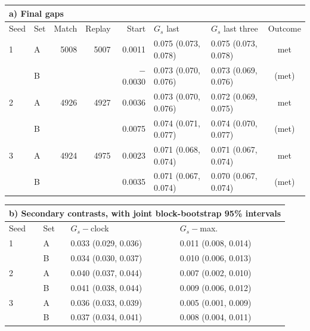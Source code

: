 \begin{tabular}{llrrrllc}
\multicolumn{8}{l}{a) Final gaps}\\
\toprule
Seed & Set & Match & Replay & Start & $G_s$ last & $G_s$ last three & Outcome\\
\midrule
1 & A & 5008 & 5007 & 0.0011 & 0.075 (0.073, 0.078) & 0.075 (0.073, 0.078) & met\\
 & B &  &  & $-$0.0030 & 0.073 (0.070, 0.076) & 0.073 (0.069, 0.076) & (met)\\
2 & A & 4926 & 4927 & 0.0036 & 0.073 (0.070, 0.076) & 0.072 (0.069, 0.075) & met\\
 & B &  &  & 0.0075 & 0.074 (0.071, 0.077) & 0.074 (0.070, 0.077) & (met)\\
3 & A & 4924 & 4975 & 0.0023 & 0.071 (0.068, 0.074) & 0.071 (0.067, 0.074) & met\\
 & B &  &  & 0.0035 & 0.071 (0.067, 0.074) & 0.070 (0.067, 0.074) & (met)\\
\bottomrule
\end{tabular}

\vspace{8pt}

\begin{tabular}{llll}
\multicolumn{4}{l}{b) Secondary contrasts, with joint block-bootstrap 95\% intervals}\\
\toprule
Seed & Set & $G_s-$clock & $G_s-$max.\\
\midrule
1 & A & 0.033 (0.029, 0.036) & 0.011 (0.008, 0.014)\\
 & B & 0.034 (0.030, 0.037) & 0.010 (0.006, 0.013)\\
2 & A & 0.040 (0.037, 0.044) & 0.007 (0.002, 0.010)\\
 & B & 0.041 (0.038, 0.044) & 0.009 (0.006, 0.012)\\
3 & A & 0.036 (0.033, 0.039) & 0.005 (0.001, 0.009)\\
 & B & 0.037 (0.034, 0.041) & 0.008 (0.004, 0.011)\\
\bottomrule
\end{tabular}
